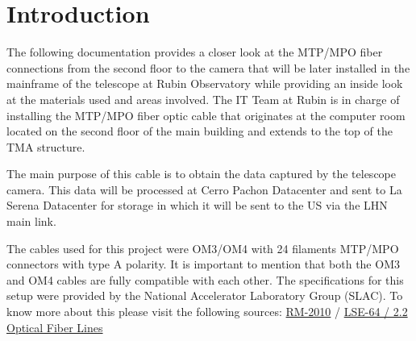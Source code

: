 \section{Introduction}

The following documentation provides a closer look at the MTP/MPO fiber connections from the second floor to the camera that will be later installed in the mainframe of the telescope at Rubin Observatory while providing an inside look at the materials used and areas involved. The IT Team at Rubin is in charge of installing the MTP/MPO fiber optic cable that originates at the computer room located on the second floor of the main building and extends to the top of the TMA structure.

The main purpose of this cable is to obtain the data captured by the telescope camera. This data will be processed at Cerro Pachon Datacenter and sent to La Serena Datacenter for storage in which it will be sent to the US via the LHN main link.

 The cables used for this project were OM3/OM4 with 24 filaments MTP/MPO connectors with type A polarity. It is important to mention that both the OM3 and OM4 cables are fully compatible with each other. The specifications for this setup were provided by the National Accelerator Laboratory Group (SLAC). To know more about this please visit the following sources: \href{https://jira.lsstcorp.org/browse/RM-2010?jql=text%20~%20%22DAQ%22}{RM-2010} / \href{https://docushare.lsst.org/docushare/dsweb/Get/LSE-64}{LSE-64 / 2.2 Optical Fiber Lines}

